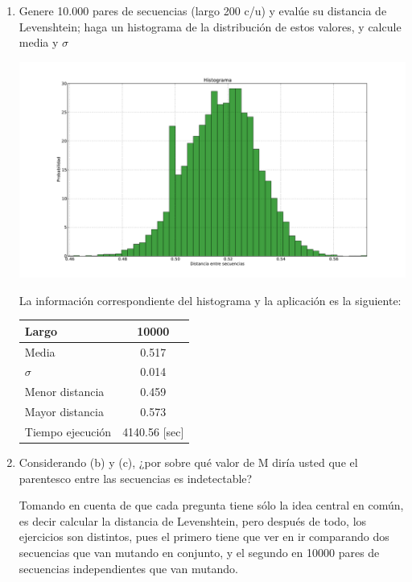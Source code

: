 \begin{enumerate}
	\item Genere 10.000 pares de secuencias (largo 200 c/u) y evalúe su distancia de Levenshtein; haga
		un histograma de la distribución de estos valores, y calcule media y $\sigma$


		\begin{center}
			\includegraphics[width=\textwidth]{scripts/pregunta-2-3-new.pdf}
		\end{center}

		La información correspondiente del histograma y la aplicación es la siguiente:

		\begin{center}
		\begin{tabular}{|l|c|}
		\hline
		Largo 			 & 10000   \\\hline
		Media  			 & 0.517 \\\hline
		$\sigma$ 		 & 0.014   \\\hline
		Menor distancia  & 0.459   \\\hline
		Mayor distancia  & 0.573   \\\hline
		Tiempo ejecución & 4140.56 [sec] \\\hline
		\end{tabular}
		\end{center}

	\item Considerando (b) y (c), ¿por sobre qué valor de M diría usted que el parentesco entre las
		secuencias es indetectable?


		Tomando en cuenta de que cada pregunta tiene sólo la idea central en común,
		es decir calcular la distancia de Levenshtein, pero después de todo,
		los ejercicios son distintos, pues el primero tiene que ver en ir comparando
		dos secuencias que van mutando en conjunto, y el segundo en 10000 pares de
		secuencias independientes que van mutando.


\end{enumerate}

